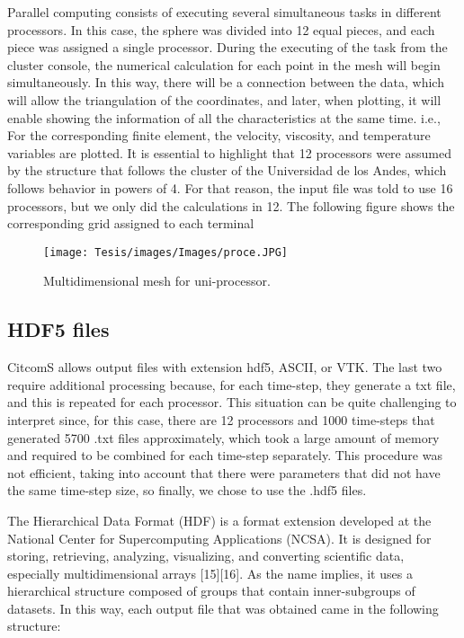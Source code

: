 \documentclass[../main.tex]{subfiles}
\begin{document}
Parallel computing consists of executing several simultaneous tasks in different processors. In this case, the sphere was divided into 12 equal pieces, and each piece was assigned a single processor. During the executing of the task from the cluster console, the numerical calculation for each point in the mesh will begin simultaneously. In this way, there will be a connection between the data, which will allow the triangulation of the coordinates, and later, when plotting, it will enable showing the information of all the characteristics at the same time. i.e., For the corresponding finite element, the velocity, viscosity, and temperature variables are plotted. It is essential to highlight that 12 processors were assumed by the structure that follows the cluster of the Universidad de los Andes, which follows behavior in powers of 4. For that reason, the input file was told to use 16 processors, but we only did the calculations in 12. The following figure shows the corresponding grid assigned to each terminal
\begin{figure}[h]
    \centering
    \texttt{[image: Tesis/images/Images/proce.JPG]}
    \label{fig:my_label}
    \centering
    \caption{Multidimensional mesh for uni-processor.}
\end{figure}

\vspace{5mm}



\subsection{HDF5 files}

CitcomS allows output files with extension hdf5, ASCII, or VTK. The last two require additional processing because, for each time-step, they generate a txt file, and this is repeated for each processor. This situation can be quite challenging to interpret since, for this case, there are 12 processors and 1000 time-steps that generated  5700 .txt files approximately, which took a large amount of memory and required to be combined for each time-step separately. This procedure was not efficient, taking into account that there were parameters that did not have the same time-step size, so finally, we chose to use the .hdf5 files.


The Hierarchical Data Format (HDF) is a format extension developed at the National Center for Supercomputing Applications (NCSA). It is designed for storing, retrieving, analyzing, visualizing, and converting scientific data, especially multidimensional arrays [15][16]. As the name implies, it uses a hierarchical structure composed of groups that contain inner-subgroups of datasets. In this way, each output file that was obtained came in the following structure: 
\end{document}
